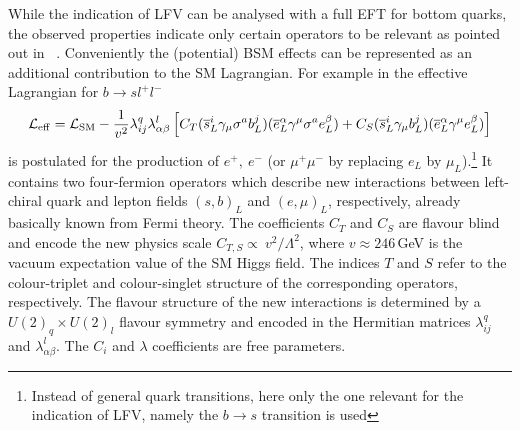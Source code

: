 {While the indication of LFV can be analysed with a full EFT for bottom
quarks, the observed properties indicate only certain operators to be
relevant as pointed out in~ \citet{Buttazzo:2017ixm}. Conveniently the
(potential) BSM effects can be represented as an additional
contribution to the SM Lagrangian.  For example in
\citet{Buttazzo:2017ixm} the effective Lagrangian for
$b\rightarrow s l^+l^-$
\begin{equation}\label{eq:leff}
{\cal L}_{\rm eff} = {\cal L}_{\rm SM} - \frac{1}{v^2}\lambda^q_{ij}\lambda^l_{\alpha\beta}\left[C_T(\overline{s}^i_L\gamma_\mu\sigma^a b^j_L)(\overline{e}_L^\alpha\gamma^\mu\sigma^a e_L^\beta)+C_S(\overline{s}_L^i\gamma_\mu b_L^j)(\overline{e}_L^\alpha\gamma^\mu e_L^\beta)\right]
\end{equation}
is postulated for the production of $e^+,~e^-$ (or $\mu^+ \mu^-$ by
replacing $e_L$ by $\mu_L$).\footnote{Instead of general quark
  transitions, here only the one relevant for the indication of LFV,
  namely the $b\rightarrow s$ transition is used} It contains two
four-fermion operators which describe new interactions between
left-chiral quark and lepton fields $(s,b)_L$ and $(e,\mu )_L$,
respectively, already basically known from Fermi theory.  The
coefficients $C_T$ and $C_S$ are flavour blind and encode the new
physics scale $C_{T,S} \propto \ v^2/\Lambda^2$, where $v \approx
246$\,GeV is the vacuum expectation value of the SM Higgs field. The indices $T$ and $S$ refer
to the colour-triplet and colour-singlet structure of the
corresponding operators, respectively.  The flavour structure of the
new interactions is determined by a $U(2)_q\times U(2)_l$ flavour
symmetry and encoded in the Hermitian matrices $\lambda^q_{ij}$ and
$\lambda^l_{\alpha\beta}$. The $C_i$ and $\lambda $ coefficients are
free parameters.

}
